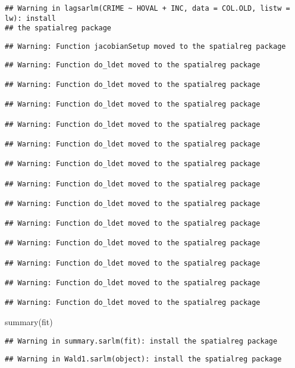 \documentclass[
]{article}
\newenvironment{Shaded}{\begin{snugshade}}{\end{snugshade}}
\newcommand{\FunctionTok}[1]{\textcolor[rgb]{0.00,0.00,0.00}{#1}}
\newcommand{\NormalTok}[1]{#1}
\begin{document}
\begin{verbatim}
## Warning in lagsarlm(CRIME ~ HOVAL + INC, data = COL.OLD, listw = lw): install
## the spatialreg package
\end{verbatim}

\begin{verbatim}
## Warning: Function jacobianSetup moved to the spatialreg package
\end{verbatim}

\begin{verbatim}
## Warning: Function do_ldet moved to the spatialreg package

## Warning: Function do_ldet moved to the spatialreg package

## Warning: Function do_ldet moved to the spatialreg package

## Warning: Function do_ldet moved to the spatialreg package

## Warning: Function do_ldet moved to the spatialreg package

## Warning: Function do_ldet moved to the spatialreg package

## Warning: Function do_ldet moved to the spatialreg package

## Warning: Function do_ldet moved to the spatialreg package

## Warning: Function do_ldet moved to the spatialreg package

## Warning: Function do_ldet moved to the spatialreg package

## Warning: Function do_ldet moved to the spatialreg package

## Warning: Function do_ldet moved to the spatialreg package

## Warning: Function do_ldet moved to the spatialreg package
\end{verbatim}

\begin{Shaded}
\begin{Highlighting}[]
\FunctionTok{summary}\NormalTok{(fit)}
\end{Highlighting}
\end{Shaded}

\begin{verbatim}
## Warning in summary.sarlm(fit): install the spatialreg package
\end{verbatim}

\begin{verbatim}
## Warning in Wald1.sarlm(object): install the spatialreg package
\end{verbatim}
\end{document}
